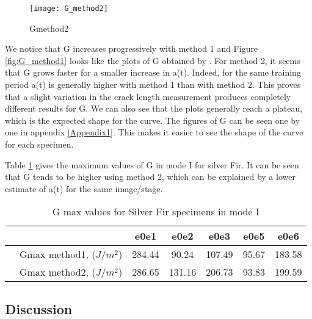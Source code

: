 \begin{figure}[htp]
	\centering
	\texttt{[image: G\_method2]}
	\caption{Gmethod2}
	\label{fig:G_method2}
\end{figure}

We notice that G increases progressively with method 1 and Figure \ref{fig:G_method1} looks like the plots of G obtained by \cite{Odounga2018phd}. For method 2, it seems that G grows faster for a smaller increase in a(t). Indeed, for the same training period a(t) is generally higher with method 1 than with method 2. This proves that a slight variation in the crack length measurement produces completely different results for G. We can also see that the plots generally reach a plateau, which is the expected shape for the curve.
The figures of G can be seen one by one in appendix \ref{Appendix1}. This makes it easier to see the shape of the curve for each specimen.

Table \ref{fig:tableG1} gives the maximum values of G in mode I for silver Fir. It can be seen that G tends to be higher using method 2, which can be explained by a lower estimate of a(t) for the same image/stage.

\begin{table} [H]
	\centering
	\begin{tabular}{ccccccc}
		\toprule %
		&  & e0e1 & e0e2 & e0e3 & e0e5 & e0e6\\\midrule
		& Gmax method1, ($J/m^2$) & 284.44 & 90.24 & 107.49 & 95.67 & 183.58 \\\midrule
		& Gmax method2, ($J/m^2$) & 286.65 & 131.16 & 206.73 & 93.83 & 199.59 \\\midrule
	\end{tabular}
	\caption{G max values for Silver Fir specimens in mode I}
	\label{fig:tableG1}
\end{table}

\subsection{Discussion}

